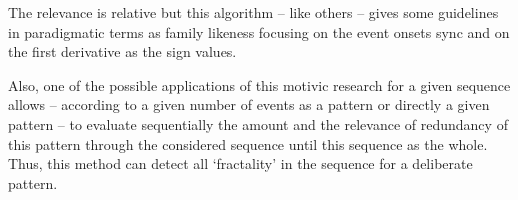 \bigskip

The relevance is relative but this algorithm -- like others -- gives some guidelines in paradigmatic terms as family likeness focusing on the event onsets sync  and on the first derivative  as the sign values. 

\bigskip

Also, one of the possible applications of this motivic research for a given sequence allows -- according to a given number of events as a pattern or directly a given pattern -- to evaluate sequentially the amount and the relevance of redundancy of this pattern through the considered sequence until this sequence as the whole. Thus, this method can detect all `fractality' in the sequence for a deliberate pattern.
